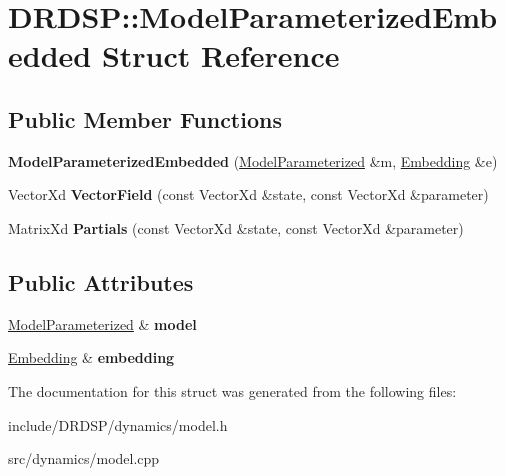 \hypertarget{struct_d_r_d_s_p_1_1_model_parameterized_embedded}{\section{D\-R\-D\-S\-P\-:\-:Model\-Parameterized\-Embedded Struct Reference}
\label{struct_d_r_d_s_p_1_1_model_parameterized_embedded}
}
\subsection*{Public Member Functions}
\begin{DoxyCompactItemize}
\item 
\hypertarget{struct_d_r_d_s_p_1_1_model_parameterized_embedded_a3a8a9503f4175ab7c015912661a93fad}{{\bfseries Model\-Parameterized\-Embedded} (\hyperlink{struct_d_r_d_s_p_1_1_model_parameterized}{Model\-Parameterized} \&m, \hyperlink{struct_d_r_d_s_p_1_1_embedding}{Embedding} \&e)}\label{struct_d_r_d_s_p_1_1_model_parameterized_embedded_a3a8a9503f4175ab7c015912661a93fad}

\item 
\hypertarget{struct_d_r_d_s_p_1_1_model_parameterized_embedded_a1b2616cdd5889d38bfcf68116aaa9355}{Vector\-Xd {\bfseries Vector\-Field} (const Vector\-Xd \&state, const Vector\-Xd \&parameter)}\label{struct_d_r_d_s_p_1_1_model_parameterized_embedded_a1b2616cdd5889d38bfcf68116aaa9355}

\item 
\hypertarget{struct_d_r_d_s_p_1_1_model_parameterized_embedded_ae7ba4d682d23057bdb6d09b1b0005f33}{Matrix\-Xd {\bfseries Partials} (const Vector\-Xd \&state, const Vector\-Xd \&parameter)}\label{struct_d_r_d_s_p_1_1_model_parameterized_embedded_ae7ba4d682d23057bdb6d09b1b0005f33}

\end{DoxyCompactItemize}
\subsection*{Public Attributes}
\begin{DoxyCompactItemize}
\item 
\hypertarget{struct_d_r_d_s_p_1_1_model_parameterized_embedded_ad28b3f0f264467c90fdf0577247b78c9}{\hyperlink{struct_d_r_d_s_p_1_1_model_parameterized}{Model\-Parameterized} \& {\bfseries model}}\label{struct_d_r_d_s_p_1_1_model_parameterized_embedded_ad28b3f0f264467c90fdf0577247b78c9}

\item 
\hypertarget{struct_d_r_d_s_p_1_1_model_parameterized_embedded_acb6dafec5e47012779a1b7fcbee6227d}{\hyperlink{struct_d_r_d_s_p_1_1_embedding}{Embedding} \& {\bfseries embedding}}\label{struct_d_r_d_s_p_1_1_model_parameterized_embedded_acb6dafec5e47012779a1b7fcbee6227d}

\end{DoxyCompactItemize}


The documentation for this struct was generated from the following files\-:\begin{DoxyCompactItemize}
\item 
include/\-D\-R\-D\-S\-P/dynamics/model.\-h\item 
src/dynamics/model.\-cpp\end{DoxyCompactItemize}
